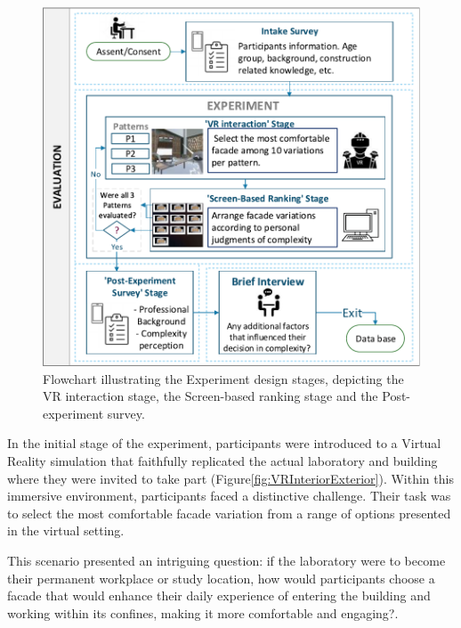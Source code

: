     \begin{figure}[htb]
      \centering
      \includegraphics[width= \linewidth, trim=0 0 0 0, clip]{Images/FlowchartExperiment}
      \caption{Flowchart illustrating the Experiment design stages, depicting the VR interaction stage, the Screen-based ranking stage and the Post-experiment survey.}
      \label{fig:ExperimentFlowchart}
    \end{figure}


In the initial stage of the experiment, participants were introduced to a Virtual Reality simulation that faithfully replicated the actual laboratory and building where they were invited to take part (Figure\ref{fig:VRInteriorExterior}).
Within this immersive environment, participants faced a distinctive challenge.
Their task was to select the most comfortable facade variation from a range of options presented in the virtual setting.

This scenario presented an intriguing question: if the laboratory were to become their permanent workplace or study location, how would participants choose a facade that would enhance their daily experience of entering the building and working within its confines, making it more comfortable and engaging?.

